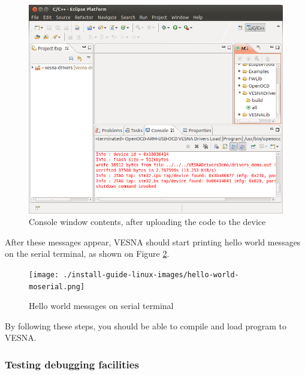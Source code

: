 \documentclass[a4paper, 10pt]{article}
\begin{document}
    \begin{figure}[H]
    \centering
        \includegraphics[width=\textwidth]{./install-guide-linux-images/load-successful.png}
        \caption{Console window contents, after uploading the code to the device}
        \label{fig:load-successful}
    \end{figure}

After these messages appear, VESNA should start printing hello world messages
on the serial terminal, as shown on Figure \ref{fig:hello-world}.

    \begin{figure}[H]
    \centering
        \texttt{[image: ./install-guide-linux-images/hello-world-moserial.png]}
        \caption{Hello world messages on serial terminal}
        \label{fig:hello-world}
    \end{figure}


By following these steps, you should be able to compile and load program to VESNA.

\subsubsection{Testing debugging facilities}
\end{document}
